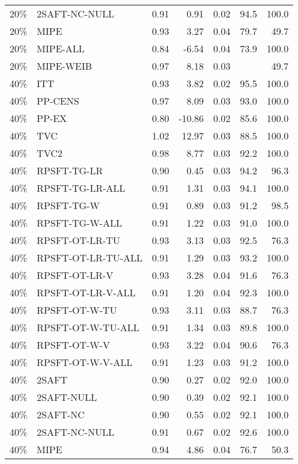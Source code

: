 \begin{table}[ht]
{\begin{tabular}{llrrrrr}
  20\% & 2SAFT-NC-NULL & 0.91 & 0.91 & 0.02 & 94.5 & 100.0 \\ 
  20\% & MIPE & 0.93 & 3.27 & 0.04 & 79.7 & 49.7 \\ 
  20\% & MIPE-ALL & 0.84 & -6.54 & 0.04 & 73.9 & 100.0 \\ 
  20\% & MIPE-WEIB & 0.97 & 8.18 & 0.03 &  & 49.7 \\ 
   \hline
40\% & ITT & 0.93 & 3.82 & 0.02 & 95.5 & 100.0 \\ 
  40\% & PP-CENS & 0.97 & 8.09 & 0.03 & 93.0 & 100.0 \\ 
  40\% & PP-EX & 0.80 & -10.86 & 0.02 & 85.6 & 100.0 \\ 
  40\% & TVC & 1.02 & 12.97 & 0.03 & 88.5 & 100.0 \\ 
  40\% & TVC2 & 0.98 & 8.77 & 0.03 & 92.2 & 100.0 \\ 
   \hline
40\% & RPSFT-TG-LR & 0.90 & 0.45 & 0.03 & 94.2 & 96.3 \\ 
  40\% & RPSFT-TG-LR-ALL & 0.91 & 1.31 & 0.03 & 94.1 & 100.0 \\ 
  40\% & RPSFT-TG-W & 0.91 & 0.89 & 0.03 & 91.2 & 98.5 \\ 
  40\% & RPSFT-TG-W-ALL & 0.91 & 1.22 & 0.03 & 91.0 & 100.0 \\ 
  40\% & RPSFT-OT-LR-TU & 0.93 & 3.13 & 0.03 & 92.5 & 76.3 \\ 
  40\% & RPSFT-OT-LR-TU-ALL & 0.91 & 1.29 & 0.03 & 93.2 & 100.0 \\ 
  40\% & RPSFT-OT-LR-V & 0.93 & 3.28 & 0.04 & 91.6 & 76.3 \\ 
  40\% & RPSFT-OT-LR-V-ALL & 0.91 & 1.20 & 0.04 & 92.3 & 100.0 \\ 
   \hline
40\% & RPSFT-OT-W-TU & 0.93 & 3.11 & 0.03 & 88.7 & 76.3 \\ 
  40\% & RPSFT-OT-W-TU-ALL & 0.91 & 1.34 & 0.03 & 89.8 & 100.0 \\ 
  40\% & RPSFT-OT-W-V & 0.93 & 3.22 & 0.04 & 90.6 & 76.3 \\ 
  40\% & RPSFT-OT-W-V-ALL & 0.91 & 1.23 & 0.03 & 91.2 & 100.0 \\ 
   \hline
40\% & 2SAFT & 0.90 & 0.27 & 0.02 & 92.0 & 100.0 \\ 
  40\% & 2SAFT-NULL & 0.90 & 0.39 & 0.02 & 92.1 & 100.0 \\ 
  40\% & 2SAFT-NC & 0.90 & 0.55 & 0.02 & 92.1 & 100.0 \\ 
  40\% & 2SAFT-NC-NULL & 0.91 & 0.67 & 0.02 & 92.6 & 100.0 \\ 
  40\% & MIPE & 0.94 & 4.86 & 0.04 & 76.7 & 50.3 \\ 

\end{tabular}}
\end{table}
